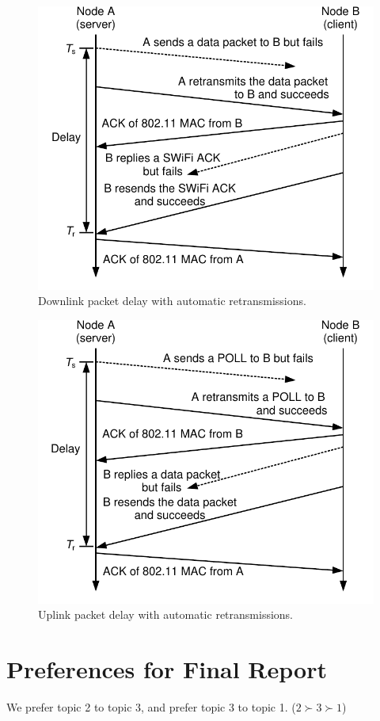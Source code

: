 \documentclass{article}
\begin{document}
\begin{figure}[h]
\centering
\includegraphics[scale = 0.7]{downlink_delay.pdf}
\caption{Downlink packet delay with automatic retransmissions.}
\end{figure}

\begin{figure}[h]
\centering
\includegraphics[scale = 0.7]{uplink_delay.pdf}
\caption{Uplink packet delay with automatic retransmissions.}
\end{figure}


\section{Preferences for Final Report}
We prefer topic 2 to topic 3, and prefer topic 3 to topic 1. ($2 \succ 3 \succ 1$)
\end{document}
